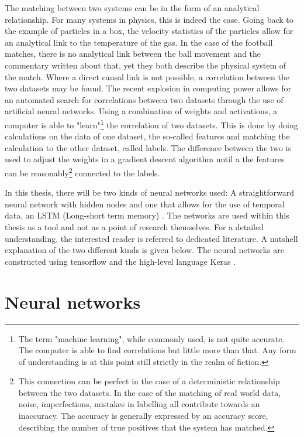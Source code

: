 \documentclass[10pt, a4paper]{UUThesisTemplate}
\begin{document}
The matching between two systems can be in the form of an analytical relationship. For many systems in physics, this is indeed the case. Going back to the example of particles in a box, the velocity statistics of the particles allow for an analytical link to the temperature of the gas. In the case of the football matches, there is no analytical link between the ball movement and the commentary written about that, yet they both describe the physical system of the match. Where a direct causal link is not possible, a correlation between the two datasets may be found. The recent explosion in computing power allows for an automated search for correlations between two datasets through the use of artificial neural networks. Using a combination of weights and activations, a computer is able to "learn"\footnote{The term "machine learning", while commonly used, is not quite accurate. The computer is able to find correlations but little more than that. Any form of understanding is at this point still strictly in the realm of fiction.} the correlation of two datasets. This is done by doing calculations on the data of one dataset, the so-called features and matching the calculation to the other dataset, called labels. The difference between the two is used to adjust the weights in a gradient descent algorithm until a the features can be reasonably\footnote{This connection can be perfect in the case of a deterministic relationship between the two datasets. In the case of the matching of real world data, noise, imperfections, mistakes in labelling all contribute towards an inaccuracy. The accuracy is generally expressed by an accuracy score, describing the number of true positives that the system has matched.} connected to the labels.

In this thesis, there will be two kinds of neural networks used: A straightforward neural network with hidden nodes \cite{NN} and one that allows for the use of temporal data, an LSTM (Long-short term memory) \cite{Hofreiter97}. The networks are used within this thesis as a tool and not as a point of research themselves. For a detailed understanding, the interested reader is referred to dedicated literature. A nutshell explanation of the two different kinds is given below. The neural networks are constructed using tensorflow \cite{tensorflow} and the high-level language Keras \cite{Keras}.

\section{Neural networks}
\end{document}
